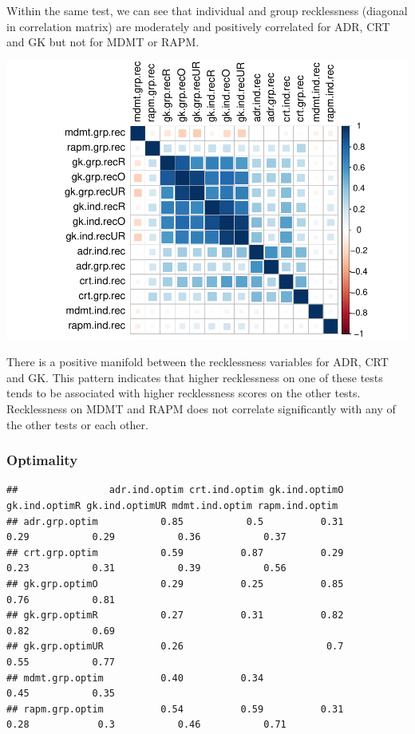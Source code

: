 \documentclass[]{article}
\begin{document}
Within the same test, we can see that individual and group recklessness
(diagonal in correlation matrix) are moderately and positively
correlated for ADR, CRT and GK but not for MDMT or RAPM.

\includegraphics{corr_analyses_files/figure-latex/recklessness2-1.pdf}

There is a positive manifold between the recklessness variables for ADR,
CRT and GK. This pattern indicates that higher recklessness on one of
these tests tends to be associated with higher recklessness scores on
the other tests. Recklessness on MDMT and RAPM does not correlate
significantly with any of the other tests or each other.

\subsubsection{Optimality}\label{optimality}

\begin{verbatim}
##                adr.ind.optim crt.ind.optim gk.ind.optimO gk.ind.optimR gk.ind.optimUR mdmt.ind.optim rapm.ind.optim
## adr.grp.optim           0.85           0.5          0.31          0.29           0.29           0.36           0.37
## crt.grp.optim           0.59          0.87          0.29          0.23           0.31           0.39           0.56
## gk.grp.optimO           0.29          0.25          0.85          0.76           0.81                              
## gk.grp.optimR           0.27          0.31          0.82          0.82           0.69                              
## gk.grp.optimUR          0.26                         0.7          0.55           0.77                              
## mdmt.grp.optim          0.40          0.34                                                      0.45           0.35
## rapm.grp.optim          0.54          0.59          0.31          0.28            0.3           0.46           0.71
\end{verbatim}
\end{document}
